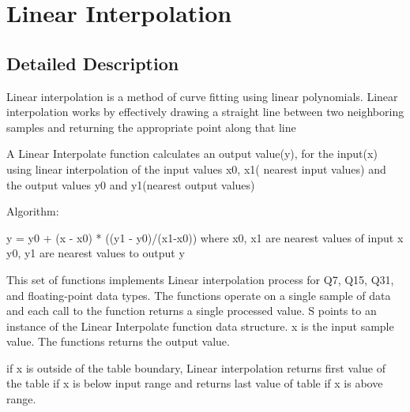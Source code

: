 \hypertarget{group___linear_interpolate}{\section{Linear Interpolation}
\label{group___linear_interpolate}
}


\subsection{Detailed Description}
Linear interpolation is a method of curve fitting using linear polynomials. Linear interpolation works by effectively drawing a straight line between two neighboring samples and returning the appropriate point along that line

\begin{DoxyParagraph}{}
 
\end{DoxyParagraph}
\begin{DoxyParagraph}{}
A Linear Interpolate function calculates an output value(y), for the input(x) using linear interpolation of the input values x0, x1( nearest input values) and the output values y0 and y1(nearest output values)
\end{DoxyParagraph}
\begin{DoxyParagraph}{Algorithm\-:}

\begin{DoxyPre}
      y = y0 + (x - x0) * ((y1 - y0)/(x1-x0))
      where x0, x1 are nearest values of input x
            y0, y1 are nearest values to output y
\end{DoxyPre}

\end{DoxyParagraph}
\begin{DoxyParagraph}{}
This set of functions implements Linear interpolation process for Q7, Q15, Q31, and floating-\/point data types. The functions operate on a single sample of data and each call to the function returns a single processed value. {\ttfamily S} points to an instance of the Linear Interpolate function data structure. {\ttfamily x} is the input sample value. The functions returns the output value.
\end{DoxyParagraph}
\begin{DoxyParagraph}{}
if x is outside of the table boundary, Linear interpolation returns first value of the table if x is below input range and returns last value of table if x is above range. 
\end{DoxyParagraph}
